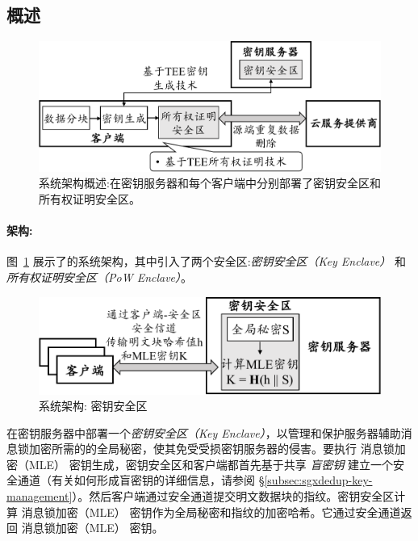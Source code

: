 \subsection{概述}
\label{subsec:sgxdedup-arch}

\begin{figure}[t]
\centering
\includegraphics[width=\textwidth]{pic/sgxdedup/sgxdedup-arch.pdf}
\caption{\sysnameS 系统架构概述:\sysnameS 在密钥服务器和每个客户端中分别部署了密钥安全区和所有权证明安全区。}
\label{fig:sgxdedup-overview}
\vspace{-3pt}
\end{figure}

\paragraph*{架构:} 图~\ref{fig:sgxdedup-overview} 展示了\sysnameS 的系统架构，其中引入了两个安全区:\textit{密钥安全区（Key Enclave）} 和 \textit{所有权证明安全区（PoW Enclave）}。 

\begin{figure}[!htb]
  \centering
  \includegraphics[width=\textwidth]{pic/sgxdedup/key-enclave.pdf}
  \caption{\sysnameS 系统架构: 密钥安全区}
  \label{fig:sgxdedup-overview-key}
  \vspace{-3pt}
\end{figure}


\sysnameS 在密钥服务器中部署一个\textit{密钥安全区（Key Enclave）}，以管理和保护服务器辅助消息锁加密所需的的全局秘密，使其免受受损密钥服务器的侵害。要执行 消息锁加密（MLE） 密钥生成，密钥安全区和客户端都首先基于共享 \textit{盲密钥} 建立一个安全通道（有关如何形成盲密钥的详细信息，请参阅 \S\ref{subsec:sgxdedup-key-management}）。然后客户端通过安全通道提交明文数据块的指纹。密钥安全区计算 消息锁加密（MLE） 密钥作为全局秘密和指纹的加密哈希。它通过安全通道返回 消息锁加密（MLE） 密钥。

